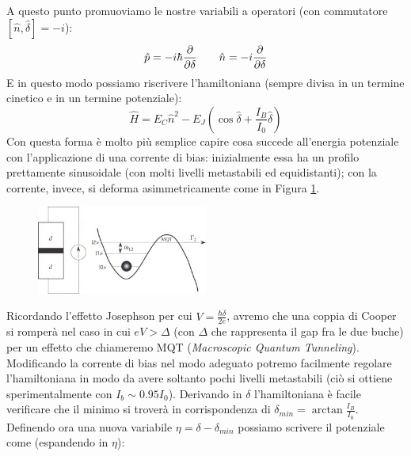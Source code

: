 \vspace{0.5cm}
\noindent A questo punto promuoviamo le nostre variabili a operatori (con commutatore $[\hat n, \hat \delta]=-i$):
\begin{equation*}
    \hat p = - i \hbar \partialderivative{\delta} \qquad \hat n = - i \partialderivative{\delta} 
\end{equation*}
E in questo modo possiamo riscrivere l'hamiltoniana (sempre divisa in un termine cinetico e in un termine potenziale):
\begin{equation*}
    \hat H = E_C \hat n ^ 2 - E_J \left( \cos{\hat\delta} + \frac{I_B}{I_0}\hat\delta \right)
\end{equation*}
Con questa forma è molto più semplice capire cosa succede all'energia potenziale con l'applicazione di una corrente di bias: inizialmente essa ha un profilo prettamente sinusoidale (con molti livelli metastabili ed equidistanti); con la corrente, invece, si deforma asimmetricamente come in Figura \ref{fig:phase_qubit_pot}.
\begin{figure}[H]
    \centering
    \includegraphics[width=0.5\textwidth]{images/phase_qubit_pot.jpg}
    \caption{}
    \label{fig:phase_qubit_pot}
\end{figure}
\noindent Ricordando l'effetto Josephson per cui $V = \frac{\hbar \dot \delta}{2e}$, avremo che una coppia di Cooper si romperà nel caso in cui $eV > \Delta$ (con $\Delta$ che rappresenta il gap fra le due buche) per un effetto che chiameremo MQT (\textit{Macroscopic Quantum Tunneling}).
Modificando la corrente di bias nel modo adeguato potremo facilmente regolare l'hamiltoniana in modo da avere soltanto pochi livelli metastabili (ciò si ottiene sperimentalmente con $I_b \sim 0.95 I_0$).
Derivando in $\delta$ l'hamiltoniana è facile verificare che il minimo si troverà in corrispondenza di $\delta_{min} = \arctan{\frac{I_B}{I_0}}$. \\
Definendo ora una nuova variabile $\eta = \delta - \delta_{min}$ possiamo scrivere il potenziale come (espandendo in $\eta$):

